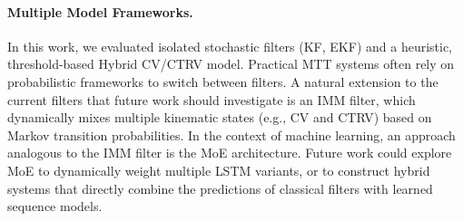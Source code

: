 \paragraph{Multiple Model Frameworks.}
In this work, we evaluated isolated stochastic filters (\ac{KF}, \ac{EKF}) and a heuristic, threshold-based Hybrid CV/CTRV model.
Practical \ac{MTT} systems often rely on probabilistic frameworks to switch between filters.
A natural extension to the current filters that future work should investigate is an \ac{IMM} filter, which dynamically mixes multiple kinematic states (e.g., CV and CTRV) based on Markov transition probabilities. In the context of machine learning, an approach analogous to the \ac{IMM} filter is the \ac{MoE} architecture. Future work could explore \ac{MoE} to dynamically weight multiple \ac{LSTM} variants, or to construct hybrid systems that directly combine the predictions of classical filters with learned sequence models.



  





